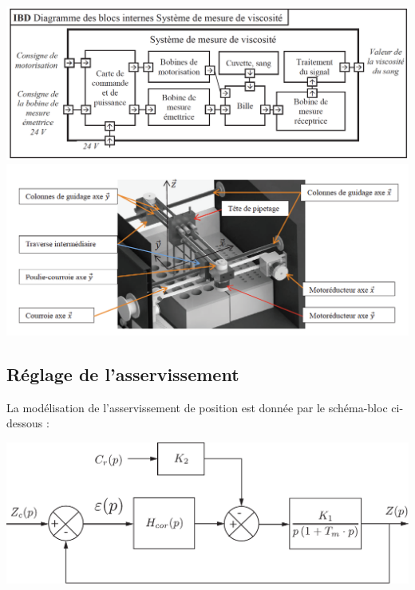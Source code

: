 \documentclass[10pt,fleqn]{article} %
\begin{document}
\begin{multicols}{2}
	\begin{center}
			\includegraphics[width=1.0\linewidth]{images/chronometrie_IBD}\\
			\includegraphics[width=1.0\linewidth]{images/schema_axez}
    \end{center}


\subsection*{Réglage de l'asservissement}


La modélisation de l'asservissement de position est donnée par le schéma-bloc ci-dessous : 


\begin{center}
\includegraphics[width=0.9\linewidth]{images/schema_bloc.pdf}
\end{center}


\end{multicols}
\end{document}
